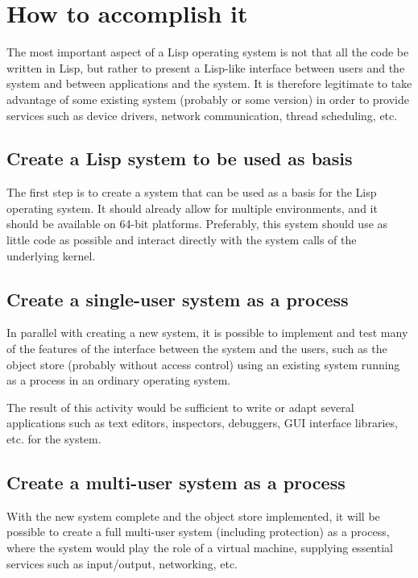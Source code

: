 \section{How to accomplish it}

The most important aspect of a Lisp operating system is not that all
the code be written in Lisp, but rather to present a Lisp-like
interface between users and the system and between applications and
the system.  It is therefore legitimate to take advantage of some
existing system (probably \linux{} or some \bsd{} version) in order to
provide services such as device drivers, network communication, thread
scheduling, etc.

\subsection{Create a Lisp system to be used as basis}

The first step is to create a \commonlisp{} system that can be used as a basis
for the Lisp operating system.  It should already allow for multiple
environments, and it should be available on 64-bit platforms.
Preferably, this system should use as little \clanguage{} code as
possible and interact directly with the system calls of the underlying
kernel.

\subsection{Create a single-user system as a \unix{} process}

In parallel with creating a new \commonlisp{} system, it is possible to
implement and test many of the features of the interface between the
system and the users, such as the object store (probably without
access control) using an existing \commonlisp{} system running as a process in
an ordinary operating system.  

The result of this activity would be sufficient to write or adapt
several applications such as text editors, inspectors, debuggers, GUI
interface libraries, etc. for the system.

\subsection{Create a multi-user system as a \unix{} process}

With the new \commonlisp{} system complete and the object store implemented,
it will be possible to create a full multi-user system (including
protection) as a \unix{} process, where the \unix{} system would play
the role of a virtual machine, supplying essential services such as
input/output, networking, etc. 

